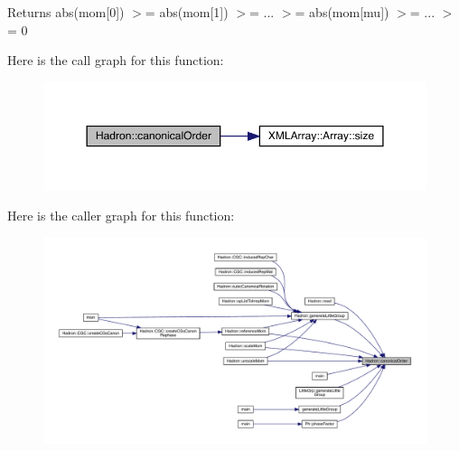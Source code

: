 \begin{DoxyReturn}{Returns}
abs(mom\mbox{[}0\mbox{]}) $>$= abs(mom\mbox{[}1\mbox{]}) $>$= ... $>$= abs(mom\mbox{[}mu\mbox{]}) $>$= ... $>$= 0 
\end{DoxyReturn}
Here is the call graph for this function\+:\nopagebreak
\begin{figure}[H]
\begin{center}
\leavevmode
\includegraphics[width=350pt]{d1/daf/namespaceHadron_a12bd76a337723c31527ee95d46f170d1_cgraph}
\end{center}
\end{figure}
Here is the caller graph for this function\+:
\nopagebreak
\begin{figure}[H]
\begin{center}
\leavevmode
\includegraphics[width=350pt]{d1/daf/namespaceHadron_a12bd76a337723c31527ee95d46f170d1_icgraph}
\end{center}
\end{figure}
\mbox{\label{namespaceHadron_ab874ef7e96f2c243de41a6ef639bf3c3}} 
